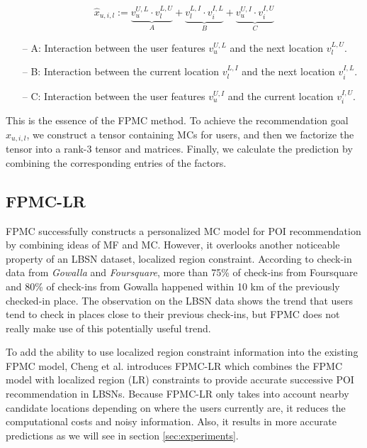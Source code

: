 \documentclass{sig-alternate}
\begin{document}
\begin{equation}
	\hat{x}_{u,i,l} := \underbrace{v_u^{U,L} \cdot v_l^{L,U}}_{A} + \underbrace{v_l^{L,I} \cdot v_i^{I,L}}_{B} 
	+ \underbrace{v_u^{U,I} \cdot v_i^{I,U}}_{C}
\label{eq:FPMC}
\end{equation}

\begin{itemize}
\item[--] A: Interaction between the user features $v_u^{U,L}$ and the next location $v_l^{L,U}$.
\item[--] B: Interaction between the current location $v_l^{L,I}$ and the next location $v_i^{I,L}$.
\item[--] C: Interaction between the user features $v_u^{U,I}$ and the current location $v_i^{I,U}$.
\end{itemize}

This is the essence of the FPMC method. To achieve the recommendation goal $\hat{x}_{u,i,l}$, we 
construct a tensor containing MCs for users, and then we factorize the tensor into a rank-3 tensor 
and matrices. Finally, we calculate the prediction by combining the corresponding entries of the
factors. 

\subsection{FPMC-LR}
\label{sec:typeChangesSpecialChars}

FPMC successfully constructs a personalized MC model for POI recommendation
by combining ideas of MF and MC. However, it overlooks another noticeable property 
of an LBSN dataset, localized region constraint. According to check-in data from 
\emph{Gowalla} and \emph{Foursquare}, more than 75\% of check-ins from Foursquare and 80\% of check-ins 
from Gowalla happened within 10 km of the previously checked-in place. \cite{Cheng:2013} The observation on the LBSN data
shows the trend that users tend to check in places close to their previous check-ins, 
but FPMC does not really make use of this potentially useful trend.

To add the ability to use localized region constraint 
information into the existing FPMC model, Cheng et al. \cite{Cheng:2013}
introduces FPMC-LR which combines the FPMC model with localized 
region (LR) constraints to provide accurate successive POI recommendation in LBSNs. 
Because FPMC-LR only takes into account nearby candidate locations depending 
on where the users currently are, it reduces the computational costs and noisy information. 
Also, it results in more accurate predictions as we will see in section \ref{sec:experiments}.
\end{document}
